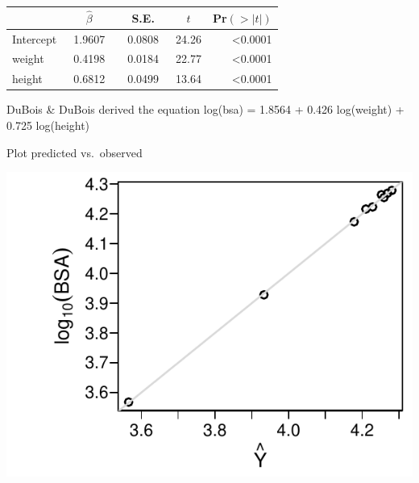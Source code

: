  \setlongtables\begin{longtable}{lrrrr}\hline
 \multicolumn{1}{l}{}&\multicolumn{1}{c}{$\hat{\beta}$}&\multicolumn{1}{c}{S.E.}&\multicolumn{1}{c}{$t$}&\multicolumn{1}{c}{Pr$(>|t|)$}\tabularnewline
 \hline
 \endhead
 \hline
 \endfoot
 Intercept&~1.9607~&~0.0808~&24.26&\textless 0.0001\tabularnewline
 weight&~0.4198~&~0.0184~&22.77&\textless 0.0001\tabularnewline
 height&~0.6812~&~0.0499~&13.64&\textless 0.0001\tabularnewline
 \hline
 \end{longtable}
 \addtocounter{table}{-1}

DuBois \& DuBois derived the equation log(bsa) = 1.8564 + 0.426
log(weight) + 0.725 log(height)

Plot predicted vs.\ observed
\begin{Schunk}


\centerline{\includegraphics[width=\maxwidth]{reg-dreg2-1} }

\end{Schunk}

